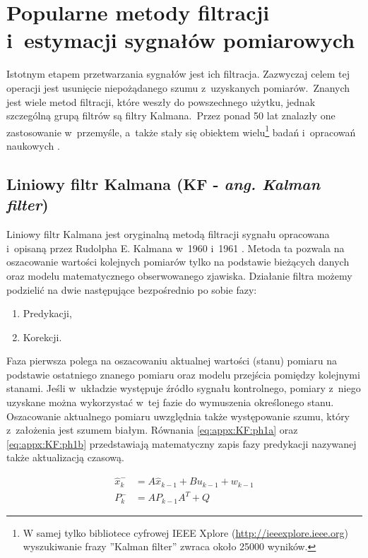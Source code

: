 \chapter{Popularne metody filtracji i~estymacji sygnałów pomiarowych}
\label{chap:appx:filters}
Istotnym etapem przetwarzania sygnałów jest ich filtracja. Zazwyczaj celem tej operacji jest usunięcie niepożądanego szumu z~uzyskanych pomiarów.~Znanych jest wiele metod filtracji, które weszły do powszechnego użytku, jednak szczególną grupą filtrów są filtry Kalmana.~Przez ponad 50 lat znalazły one zastosowanie w~przemyśle, a~także stały się obiektem wielu\footnote{W samej tylko bibliotece cyfrowej IEEE Xplore (\url{http://ieeexplore.ieee.org}) wyszukiwanie frazy ''Kalman filter'' zwraca około 25000 wyników.} badań i~opracowań naukowych \cite{Droleta,Welch2006, Kedzierski2007, Huo2014, Pandey2014}.

\section*{Liniowy filtr Kalmana (KF - \emph{ang. Kalman filter})}
\label{sec:appx:filters:KF}
Liniowy filtr Kalmana jest oryginalną metodą filtracji sygnału opracowana i~opisaną przez Rudolpha E. Kalmana w~1960 \cite{Kalman1960} i~1961 \cite{KalmanBucy1961}. Metoda ta pozwala na oszacowanie wartości kolejnych pomiarów tylko na podstawie bieżących danych oraz modelu matematycznego obserwowanego zjawiska. Działanie filtra możemy podzielić na dwie następujące bezpośrednio po sobie fazy: 
\begin{enumerate}
	\item Predykacji,
	\item Korekcji.
\end{enumerate}

Faza pierwsza polega na oszacowaniu aktualnej wartości (stanu) pomiaru na podstawie ostatniego znanego pomiaru oraz modelu przejścia pomiędzy kolejnymi stanami. Jeśli w~układzie występuje źródło sygnału kontrolnego, pomiary z~niego uzyskane można wykorzystać w~tej fazie do wymuszenia określonego stanu. Oszacowanie aktualnego pomiaru uwzględnia także występowanie szumu, który z~założenia jest szumem białym. Równania \ref{eq:appx:KF:ph1a} oraz \ref{eq:appx:KF:ph1b} przedstawiają matematyczny zapis fazy predykacji nazywanej także aktualizacją czasową.

\begin{subequations}
	\begin{align}
		\widehat{x}^-_k & = A\widehat{x}_{k-1} + Bu_{k-1} + w_{k-1}\label{eq:appx:KF:ph1a} \\
		P^-_k           & = AP_{k-1}A^T + Q \label{eq:appx:KF:ph1b}                        
	\end{align}
\end{subequations}

